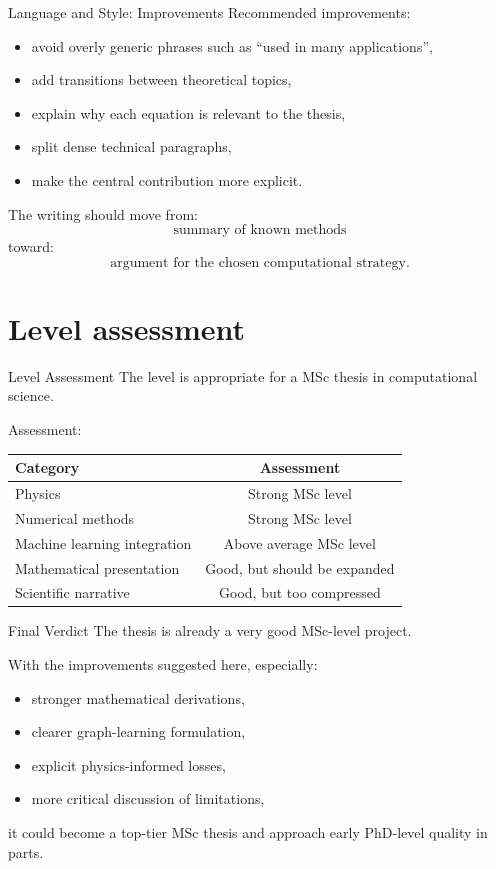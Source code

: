 \documentclass[aspectratio=169]{beamer}
\begin{document}
\begin{frame}{Language and Style: Improvements}
Recommended improvements:
\begin{itemize}
    \item avoid overly generic phrases such as ``used in many applications'',
    \item add transitions between theoretical topics,
    \item explain why each equation is relevant to the thesis,
    \item split dense technical paragraphs,
    \item make the central contribution more explicit.
\end{itemize}

\medskip

The writing should move from:
\[
\text{summary of known methods}
\]
toward:
\[
\text{argument for the chosen computational strategy}.
\]
\end{frame}

\section{Level assessment}

\begin{frame}{Level Assessment}
The level is appropriate for a MSc thesis in computational science.

\medskip

Assessment:
\begin{center}
\begin{tabular}{lc}
\toprule
Category & Assessment \\
\midrule
Physics & Strong MSc level \\
Numerical methods & Strong MSc level \\
Machine learning integration & Above average MSc level \\
Mathematical presentation & Good, but should be expanded \\
Scientific narrative & Good, but too compressed \\
\bottomrule
\end{tabular}
\end{center}
\end{frame}

\begin{frame}{Final Verdict}
The thesis is already a very good MSc-level project.

\medskip

With the improvements suggested here, especially:
\begin{itemize}
    \item stronger mathematical derivations,
    \item clearer graph-learning formulation,
    \item explicit physics-informed losses,
    \item more critical discussion of limitations,
\end{itemize}

it could become a top-tier MSc thesis and approach early PhD-level quality in parts.
\end{frame}
\end{document}
